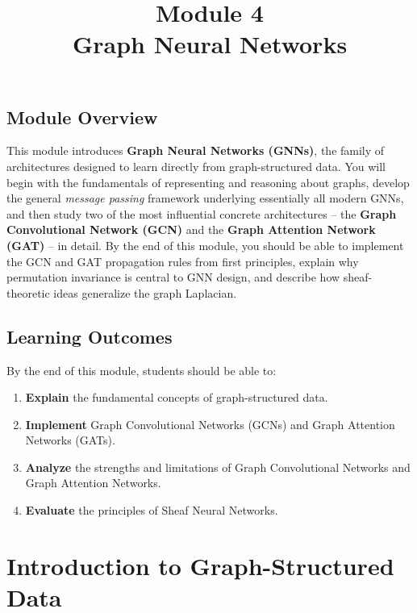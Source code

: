 \documentclass[12pt,a4paper]{article}
\title{\color{moduleblue}\Huge \textbf{Module 4}\\[0.3em]
\Large Graph Neural Networks}
\author{}
\date{}
\begin{document}
\maketitle

\begin{tcolorbox}[colback=moduleblue!6, colframe=moduleblue, arc=2mm, boxrule=1pt]
\subsection*{Module Overview}
 This module introduces \textbf{Graph Neural Networks (GNNs)}, the family of architectures designed to learn directly from graph-structured data. You will begin with the fundamentals of representing and reasoning about graphs, develop the general \emph{message passing} framework underlying essentially all modern GNNs, and then study two of the most influential concrete architectures -- the \textbf{Graph Convolutional Network (GCN)} and the \textbf{Graph Attention Network (GAT)} -- in detail.  By the end of this module, you should be able to implement the GCN and GAT propagation rules from first principles, explain why permutation invariance is central to GNN design, and describe how sheaf-theoretic ideas generalize the graph Laplacian.
\end{tcolorbox}

\subsection*{Learning Outcomes}

By the end of this module, students should be able to:
\begin{enumerate}
    \item \textbf{Explain} the fundamental concepts of graph-structured data.
    \item \textbf{Implement} Graph Convolutional Networks (GCNs) and Graph Attention Networks (GATs).
    \item \textbf{Analyze} the strengths and limitations of Graph Convolutional Networks and Graph Attention Networks.
    \item \textbf{Evaluate} the principles of Sheaf Neural Networks.
\end{enumerate}

\newpage

\section{Introduction to Graph-Structured Data}
\end{document}
